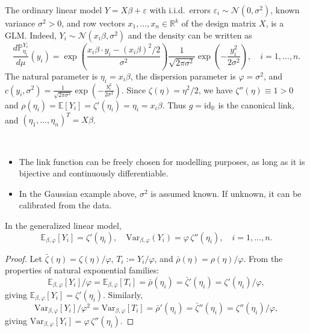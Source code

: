 \begin{example}
The ordinary linear model $Y = X\beta + \varepsilon$ with i.i.d.\ errors $\varepsilon_i \sim \mathcal{N}(0, \sigma^2)$, known variance $\sigma^2 > 0$, and row vectors $x_1, \dots, x_n \in \mathbb{R}^k$ of the design matrix $X$, is a GLM. Indeed, $Y_i \sim \mathcal{N}(x_i\beta, \sigma^2)$ and the density can be written as
\begin{equation*}
	\frac{d\mathbb{P}_{\eta_i}^{Y_i}}{d\mu}(y_i) = \exp\!\left(\frac{x_i\beta \cdot y_i - (x_i\beta)^2/2}{\sigma^2}\right) \frac{1}{\sqrt{2\pi\sigma^2}} \exp\!\left(-\frac{y_i^2}{2\sigma^2}\right), \quad i = 1, \dots, n.
\end{equation*}
The natural parameter is $\eta_i = x_i\beta$, the dispersion parameter is $\varphi = \sigma^2$, and $c(y_i, \sigma^2) = \frac{1}{\sqrt{2\pi\sigma^2}} \exp\!\left(-\frac{y_i^2}{2\sigma^2}\right)$. Since $\zeta(\eta) = \eta^2/2$, we have $\zeta''(\eta) \equiv 1 > 0$ and $\rho(\eta_i) = \mathbb{E}[Y_i] = \zeta'(\eta_i) = \eta_i = x_i\beta$. Thus $g = \mathrm{id}_{\mathbb{R}}$ is the canonical link, and $(\eta_1, \dots, \eta_n)^T = X\beta$.
\end{example}

\begin{remark} ~
\begin{itemize}
	\item The link function can be freely chosen for modelling purposes, as long as it is bijective and continuously differentiable.
	\item In the Gaussian example above, $\sigma^2$ is assumed known. If unknown, it can be calibrated from the data.
\end{itemize}
\end{remark}

\begin{lemma}
In the generalized linear model,
\begin{equation*}
	\mathbb{E}_{\beta, \varphi}[Y_i] = \zeta'(\eta_i), \quad \mathrm{Var}_{\beta, \varphi}(Y_i) = \varphi \, \zeta''(\eta_i), \quad i = 1, \dots, n.
\end{equation*}
\end{lemma}

\begin{proof}
Let $\bar{\zeta}(\eta) = \zeta(\eta)/\varphi$, $T_i := Y_i / \varphi$, and $\bar{\rho}(\eta) = \rho(\eta)/\varphi$. From the properties of natural exponential families:
\begin{equation*}
	\mathbb{E}_{\beta, \varphi}[Y_i]/\varphi = \mathbb{E}_{\beta, \varphi}[T_i] = \bar{\rho}(\eta_i) = \bar{\zeta}'(\eta_i) = \zeta'(\eta_i)/\varphi,
\end{equation*}
giving $\mathbb{E}_{\beta,\varphi}[Y_i] = \zeta'(\eta_i)$. Similarly,
\begin{equation*}
	\mathrm{Var}_{\beta, \varphi}[Y_i]/\varphi^2 = \mathrm{Var}_{\beta, \varphi}[T_i] = \bar{\rho}'(\eta_i) = \bar{\zeta}''(\eta_i) = \zeta''(\eta_i)/\varphi,
\end{equation*}
giving $\mathrm{Var}_{\beta,\varphi}[Y_i] = \varphi \, \zeta''(\eta_i)$.
\end{proof}

